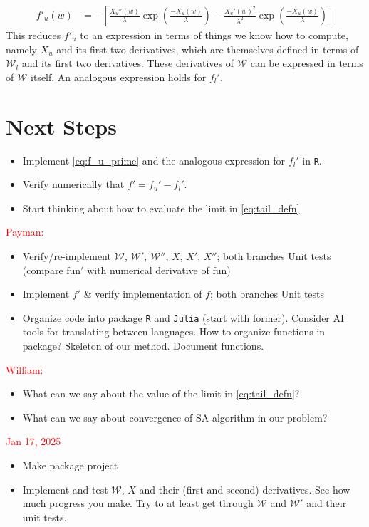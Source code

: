\documentclass{article}
\newcommand{\sW}{\mathscr{W}}
\begin{document}
\begin{align}
    f'_u(w) &= - \left[ \frac{X_u''(w)}{\lambda} \exp \left( \frac{-X_u(w)}{\lambda} \right) - \frac{X_u'(w)^2}{\lambda^2} \exp \left( \frac{-X_u(w)}{\lambda} \right)\right] \label{eq:f_u_prime}
\end{align}
%
This reduces $f'_u$ to an expression in terms of things we know how to compute, namely $X_u$ and its first two derivatives, which are themselves defined in terms of $\sW_l$ and its first two derivatives. These derivatives of $\sW$ can be expressed in terms of $\sW$ itself. An analogous expression holds for $f_l'$.

\section*{Next Steps}
\begin{itemize}
    \item Implement \ref{eq:f_u_prime} and the analogous expression for $f_l'$ in \texttt{R}.
    \item Verify numerically that $f' = f_u' - f_l'$.
    \item Start thinking about how to evaluate the limit in \eqref{eq:tail_defn}.
\end{itemize}

\textcolor{red}{Payman:}
\begin{itemize}
    \item Verify/re-implement $\sW$, $\sW'$, $\sW''$, $X$, $X'$, $X''$; both branches
        \subitem Unit tests (compare $\text{fun}'$ with numerical derivative of $\text{fun}$)
    \item Implement $f'$ \& verify implementation of $f$; both branches
        \subitem Unit tests
    \item Organize code into package
        \subitem \texttt{R} and \texttt{Julia} (start with former). Consider AI tools for translating between languages.
        \subitem How to organize functions in package?
        \subitem Skeleton of our method.
        \subitem Document functions.
\end{itemize}

\textcolor{red}{William:}
\begin{itemize}
    \item What can we say about the value of the limit in \eqref{eq:tail_defn}?
    \item What can we say about convergence of SA algorithm in our problem?
\end{itemize}

\textcolor{red}{Jan 17, 2025}
\begin{itemize}
    \item Make package project
    \item Implement and test $\sW$, $X$ and their (first and second) derivatives. See how much progress you make. Try to at least get through $\sW$ and $\sW'$ and their unit tests. 
\end{itemize}
        



\end{document}
